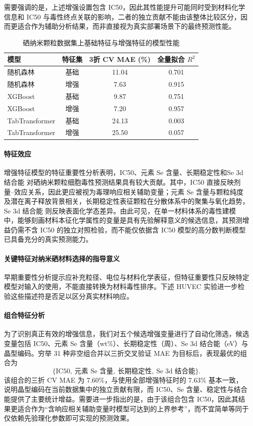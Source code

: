 \documentclass[letterpaper]{article}
\begin{document}
需要强调的是，上述增强设置包含 IC50，因此其性能提升可能同时受到材料化学信息和 IC50 与毒性终点关联的影响，二者的独立贡献不能由该整体比较区分，因而更适合作为辅助分析结果，而非直接视为真实部署场景下的最终预测性能。

\begin{table}[htbp]
  \centering
  \caption{硒纳米颗粒数据集上基础特征与增强特征的模型性能}
  \label{tab:senp_legacy_results}
  \begin{tabular}{lccc}
    \hline
    模型 & 特征集 & 3折 CV MAE (\%) & 全量拟合 $R^2$ \\
    \hline
    随机森林 & 基础 & 11.04 & 0.701 \\
    随机森林 & 增强 & 7.63 & 0.915 \\
    XGBoost & 基础 & 9.87 & 0.751 \\
    XGBoost & 增强 & 7.20 & 0.957 \\
    TabTransformer & 基础 & 24.13 & 0.003 \\
    TabTransformer & 增强 & 25.50 & 0.057 \\
    \hline
  \end{tabular}
\end{table}

\paragraph{特征效应}
增强特征模型的特征重要性分析表明，IC50、元素 Se 含量、长期稳定性和Se 3d 结合能 对硒纳米颗粒细胞毒性预测结果具有较大贡献。其中，IC50 直接反映剂量--效应关系，因此更应被视为毒理响应相关辅助变量；元素 Se 含量与颗粒纯度及潜在离子释放背景相关，长期稳定性表征颗粒在分散体系中的聚集与氧化趋势，Se 3d 结合能 则反映表面化学态差异。由此可见，在单一材料体系的毒性建模中，能够刻画材料本征化学属性的变量是具有先验解释意义的候选信息，其预测增益仍需不含 IC50 的独立对照检验，而不能仅依据含 IC50 模型的高分数判断模型已具备充分的真实预测能力。

\paragraph{关键特征对纳米硒材料选择的指导意义}
早期重要性分析提示应补充粒径、电位与材料化学表征，但特征重要性只反映特定模型对输入的使用，不能直接转换为材料毒性排序。下述 HUVEC 实验进一步检验这些描述符是否足以区分真实材料响应。

\paragraph{组合特征分析}
为了识别真正有效的增强信息，我们对五个候选增强变量进行了自动化筛选，候选变量包括 IC50、元素 Se 含量（wt\%）、长期稳定性（周）、Se 3d 结合能（eV）与晶型编码。穷举 31 种非空组合并以三折交叉验证 MAE 为目标后，表现最优的组合为
\[
\{\text{IC50},\ \text{元素 Se 含量},\ \text{长期稳定性},\ \text{Se 3d 结合能}\}.
\]
该组合的三折 CV MAE 为 7.60\%，与使用全部增强特征时的 7.63\% 基本一致，说明晶型编码在当前数据集中的独立贡献有限，而 IC50、Se 含量、稳定性与结合能提供了主要统计增益。需要进一步指出的是，由于该组合包含 IC50，因此其结果更适合作为“含响应相关辅助变量时模型可达到的上界参考”，而不宜简单等同于仅依赖先验理化参数即可实现的预测效果。
\end{document}
